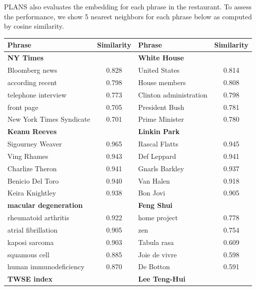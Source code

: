 PLANS also evaluates the embedding for each phrase in the restaurant. To assess
the performance, we show 5 nearest neighbors for each phrase below as computed
by cosine similarity.


\begin{table}[h]
  \centering
  \begin{tabular}{lc|lc}
    Phrase & Similarity & Phrase & Similarity \\ \hline \hline
    \textbf{NY Times} && \textbf{White House} &\\
    Bloomberg news            & 0.828 & United States             & 0.814  \\
    according recent          & 0.798 & House members             & 0.808  \\
    telephone interview       & 0.773 & Clinton administration    & 0.798  \\
    front page                & 0.705 & President Bush            & 0.781  \\
    New York Times Syndicate  & 0.701 & Prime Minister            & 0.780  \\
    \hline \hline
    \textbf{Keanu Reeves} && \textbf{Linkin Park} &\\
    Sigourney Weaver    & 0.965 & Rascal Flatts   & 0.945             \\
    Ving Rhames         & 0.943 & Def Leppard     & 0.941             \\
    Charlize Theron     & 0.941 & Gnarls Barkley  & 0.937             \\
    Benicio Del Toro    & 0.940 & Van Halen       & 0.918             \\
    Keira Knightley     & 0.938 & Bon Jovi        & 0.905             \\
    \hline \hline
    \textbf{macular degeneration} && \textbf{Feng Shui} &\\
    rheumatoid arthritis      & 0.922 &  home project    & 0.778             \\
    atrial fibrillation       & 0.905 &  zen             & 0.754             \\
    kaposi sarcoma            & 0.903 &  Tabula rasa     & 0.609             \\
    squamous cell             & 0.885 &  Joie de vivre   & 0.598             \\
    human immunodeficiency    & 0.870 &  De Botton       & 0.591             \\
    \hline \hline
    \textbf{TWSE index} && \textbf{Lee Teng-Hui} &\\

\end{tabular}
\end{table}
